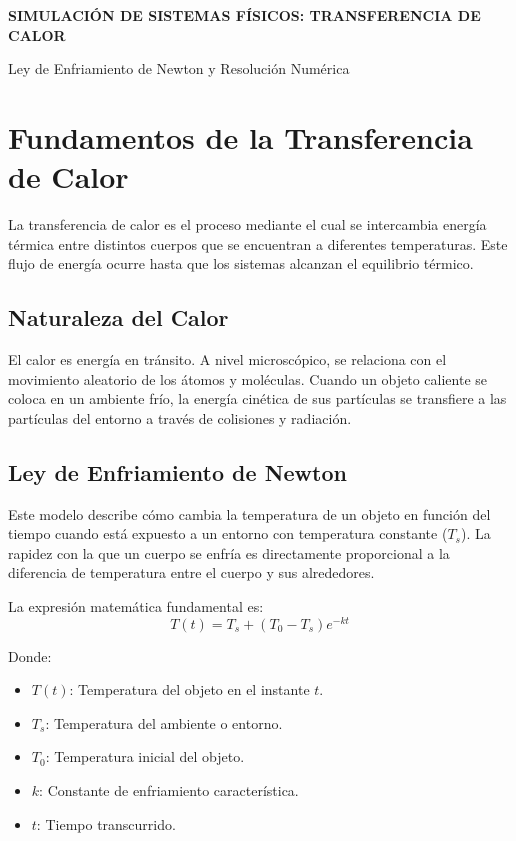 \documentclass[12pt]{article}
\begin{document}
\begin{center}
    {\bfseries\huge SIMULACIÓN DE SISTEMAS FÍSICOS: TRANSFERENCIA DE CALOR \par}
    \vspace{0.5cm}
    {\Large  Ley de Enfriamiento de Newton y Resolución Numérica \par}

\end{center}

\section{Fundamentos de la Transferencia de Calor}

La transferencia de calor es el proceso mediante el cual se intercambia energía térmica entre distintos cuerpos que se encuentran a diferentes temperaturas. Este flujo de energía ocurre hasta que los sistemas alcanzan el equilibrio térmico.

\subsection{Naturaleza del Calor}
El calor es energía en tránsito. A nivel microscópico, se relaciona con el movimiento aleatorio de los átomos y moléculas. Cuando un objeto caliente se coloca en un ambiente frío, la energía cinética de sus partículas se transfiere a las partículas del entorno a través de colisiones y radiación.

\subsection{Ley de Enfriamiento de Newton}
Este modelo describe cómo cambia la temperatura de un objeto en función del tiempo cuando está expuesto a un entorno con temperatura constante ($T_s$). La rapidez con la que un cuerpo se enfría es directamente proporcional a la diferencia de temperatura entre el cuerpo y sus alrededores.

La expresión matemática fundamental es:
\[ T(t) = T_s + (T_0 - T_s) e^{-kt} \]

Donde:
\begin{itemize}
    \item $T(t)$: Temperatura del objeto en el instante $t$.
    \item $T_s$: Temperatura del ambiente o entorno.
    \item $T_0$: Temperatura inicial del objeto.
    \item $k$: Constante de enfriamiento característica.
    \item $t$: Tiempo transcurrido.
\end{itemize}
\end{document}
